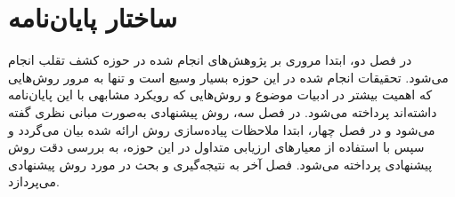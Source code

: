 \section{ساختار پایان‌نامه}
در فصل دو، ابتدا مروری بر پژوهش‌های انجام شده در حوزه کشف تقلب انجام می‌شود. تحقیقات انجام شده در این حوزه بسیار وسیع است و تنها به مرور روش‌هایی که اهمیت بیشتر در ادبیات موضوع و روش‌هایی که رویکرد مشابهی با این پایان‌نامه داشته‌اند پرداخته می‌شود. در فصل سه، روش پیشنهادی به‌صورت مبانی نظری گفته می‌شود و در فصل چهار، ابتدا ملاحظات پیاده‌سازی روش ارائه شده بیان می‌گردد و سپس با استفاده از معیارهای ارزیابی متداول در این حوزه، به بررسی دقت روش پیشنهادی پرداخته می‌شود. فصل آخر به نتیجه‌گیری و بحث در مورد روش پیشنهادی می‌پردازد.


